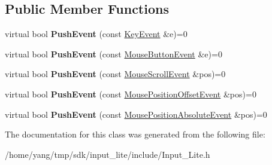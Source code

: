 \subsection*{Public Member Functions}
\begin{DoxyCompactItemize}
\item 
virtual bool {\bfseries Push\+Event} (const \hyperlink{struct_s_l_1_1_input___lite_1_1_key_event}{Key\+Event} \&e)=0\hypertarget{class_s_l_1_1_input___lite_1_1_i_input_manager_a8db0912e1b65672ae15eb600996d65ba}{}\label{class_s_l_1_1_input___lite_1_1_i_input_manager_a8db0912e1b65672ae15eb600996d65ba}

\item 
virtual bool {\bfseries Push\+Event} (const \hyperlink{struct_s_l_1_1_input___lite_1_1_mouse_button_event}{Mouse\+Button\+Event} \&e)=0\hypertarget{class_s_l_1_1_input___lite_1_1_i_input_manager_aff80761a6f2d8a50b7a52f377629d1a5}{}\label{class_s_l_1_1_input___lite_1_1_i_input_manager_aff80761a6f2d8a50b7a52f377629d1a5}

\item 
virtual bool {\bfseries Push\+Event} (const \hyperlink{struct_s_l_1_1_input___lite_1_1_mouse_scroll_event}{Mouse\+Scroll\+Event} \&pos)=0\hypertarget{class_s_l_1_1_input___lite_1_1_i_input_manager_ae6c0f5bdf760e245961d972914adfa0c}{}\label{class_s_l_1_1_input___lite_1_1_i_input_manager_ae6c0f5bdf760e245961d972914adfa0c}

\item 
virtual bool {\bfseries Push\+Event} (const \hyperlink{struct_s_l_1_1_input___lite_1_1_mouse_position_offset_event}{Mouse\+Position\+Offset\+Event} \&pos)=0\hypertarget{class_s_l_1_1_input___lite_1_1_i_input_manager_a532e4b448925ca20e6c2b2a64c77b1df}{}\label{class_s_l_1_1_input___lite_1_1_i_input_manager_a532e4b448925ca20e6c2b2a64c77b1df}

\item 
virtual bool {\bfseries Push\+Event} (const \hyperlink{struct_s_l_1_1_input___lite_1_1_mouse_position_absolute_event}{Mouse\+Position\+Absolute\+Event} \&pos)=0\hypertarget{class_s_l_1_1_input___lite_1_1_i_input_manager_a8abcd66871c8cd3d025eda9fca82c091}{}\label{class_s_l_1_1_input___lite_1_1_i_input_manager_a8abcd66871c8cd3d025eda9fca82c091}

\end{DoxyCompactItemize}


The documentation for this class was generated from the following file\+:\begin{DoxyCompactItemize}
\item 
/home/yang/tmp/sdk/input\+\_\+lite/include/Input\+\_\+\+Lite.\+h\end{DoxyCompactItemize}
